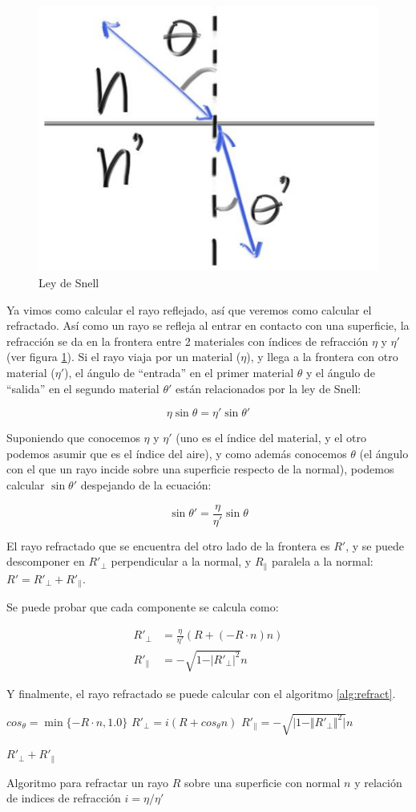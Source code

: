 \begin{figure}
  \centering
  \includegraphics[width=.35\textwidth]{imgs/refraction.jpg}
  \caption{Ley de Snell}
  \label{fig:snell-law}
\end{figure}

Ya vimos como calcular el rayo reflejado, así que veremos como calcular el
refractado. Así como un rayo se refleja al entrar en contacto con una
superficie, la refracción se da en la frontera entre 2 materiales con índices de
refracción $\eta$ y $\eta'$ (ver figura \ref{fig:snell-law}). Si el rayo viaja
por un material ($\eta$), y llega a la frontera con otro material ($\eta'$), el
ángulo de ``entrada'' en el primer material $\theta$ y el ángulo de ``salida'' en el
segundo material $\theta'$ están relacionados por la ley de Snell:

\[
  \eta \sin \theta = \eta' \sin \theta'
\]

Suponiendo que conocemos $\eta$ y $\eta'$ (uno es el índice del material, y el
otro podemos asumir que es el índice del aire), y como además conocemos $\theta$
(el ángulo con el que un rayo incide sobre una superficie respecto de la
normal), podemos calcular $\sin \theta'$ despejando de la ecuación:

\[
  \sin \theta' = \frac{\eta}{\eta'} \sin \theta
\]

El rayo refractado que se encuentra del otro lado de la frontera es $R'$, y se
puede descomponer en $R'_{\perp}$ perpendicular a la normal, y
$R_{\parallel}$ paralela a la normal: $R' = R'_{\perp} + R'_{\parallel}$.

Se puede probar que cada componente se calcula como:

\begin{align*}
  R'_{\perp}     & = \frac{\eta}{\eta'}(R + (-R \cdot n) n)  \\
  R'_{\parallel} & = - \sqrt{1 - \vert R'_{\perp} \vert^2} n
\end{align*}

Y finalmente, el rayo refractado se puede calcular con el algoritmo
\ref{alg:refract}.

\begin{algorithm}
  \begin{algorithmic}[1]

    \State $cos_{\theta} = \min\{-R \cdot n, 1.0\}$
    \State $R'_{\perp} = i (R + cos_{\theta} n)$
    \State $R'_{\parallel} = - \sqrt{\vert 1 - \Vert R'_{\perp} \Vert ^ 2 \vert} n$

    \State \Return $R'_{\perp} + R'_{\parallel}$
    \EndFunction
  \end{algorithmic}
  \caption{Algoritmo para refractar un rayo $R$ sobre una superficie con normal
    $n$ y relación de indices de refracción $i = \eta / \eta'$}
  \label{alg:refract}
\end{algorithm}

